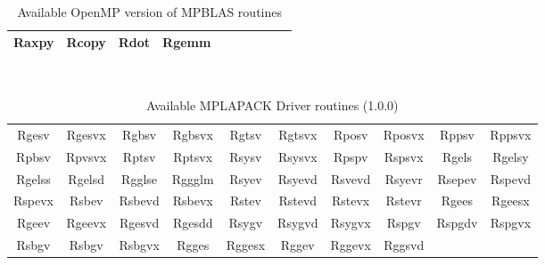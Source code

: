 \documentclass[12pt]{article}
\begin{document}
\begin{table}
\caption{Available OpenMP version of MPBLAS routines}\label{mpblasroutinesopt}
\begin{center}
{\tt
\begin{tabular}{cccccccccc} \hline
Raxpy & Rcopy & Rdot & Rgemm \\ \hline
\end{tabular}
}
\end{center}
\end{table}


\begin{table}
\caption{Available MPLAPACK Driver routines (1.0.0)}\label{mplapackdriver}
\begin{center}
{\tt 
\begin{tabular}{cccccccccc} \hline
Rgesv  & Rgesvx & Rgbsv  & Rgbsvx & Rgtsv & Rgtsvx & Rposv  & Rposvx & Rppsv  & Rppsvx \\
Rpbsv  & Rpvsvx & Rptsv  & Rptsvx & Rsysv & Rsysvx & Rpspv  & Rspsvx & Rgels  & Rgelsy \\
Rgelss & Rgelsd & Rgglse & Rggglm & Rsyev & Rsyevd & Rsvevd & Rsyevr & Rsepev & Rspevd \\
Rspevx & Rsbev & Rsbevd & Rsbevx & Rstev & Rstevd  & Rstevx & Rstevr & Rgees & Rgeesx \\
Rgeev & Rgeevx & Rgesvd & Rgesdd & Rsygv & Rsygvd & Rsygvx & Rspgv & Rspgdv & Rspgvx \\
Rsbgv & Rsbgv & Rsbgvx & Rgges  & Rggesx & Rggev & Rggevx & Rggsvd \\ \hline
\end{tabular}
}
\end{center}
\end{table}
\end{document}
